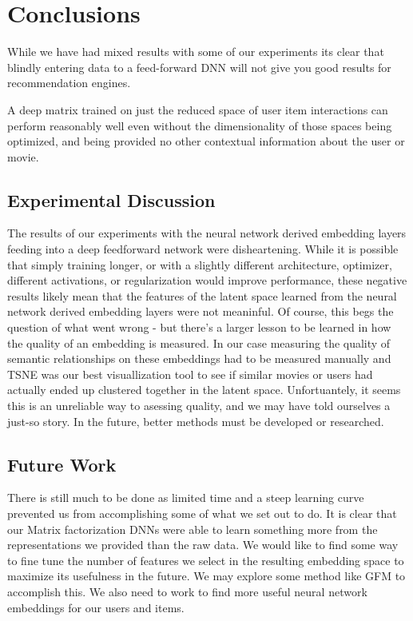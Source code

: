 \section{Conclusions}

While we have had mixed results with some of our experiments its clear that blindly entering data to a feed-forward DNN will not give you good results for recommendation engines.

A deep matrix trained on just the reduced space of user item interactions can perform reasonably well even without the dimensionality of those spaces being optimized, and being provided no other contextual information about the user or movie.

\subsection{Experimental Discussion}
The results of our experiments with the neural network derived embedding layers feeding into a deep feedforward network were disheartening. While it is possible that simply training longer, or with a slightly different architecture, optimizer, different activations, or regularization would improve performance, these negative results likely mean that the features of the latent space learned  from the neural network derived embedding layers were not meaninful. Of course, this begs the question of what went wrong - but there's a larger lesson to be learned in how the quality of an embedding is measured.  In our case measuring the quality of semantic relationships on these embeddings had to be measured manually and TSNE was our best visuallization tool to see if similar movies or users had actually ended up clustered together in the latent space. Unfortuantely, it seems this is an unreliable way to asessing quality, and we may have told ourselves a just-so story. In the future, better methods must be developed or researched.

\subsection{Future Work}

There is still much to be done as limited time and a steep learning curve prevented us from accomplishing some of what we set out to do. It is clear that our Matrix factorization DNNs were able to learn something more from the representations we provided than the raw data. We would like to find some way to fine tune the number of features we select in the resulting embedding space to maximize its usefulness in the future. We may explore some method like GFM to accomplish this. We also need to work to find more useful neural network embeddings for our users and items.

